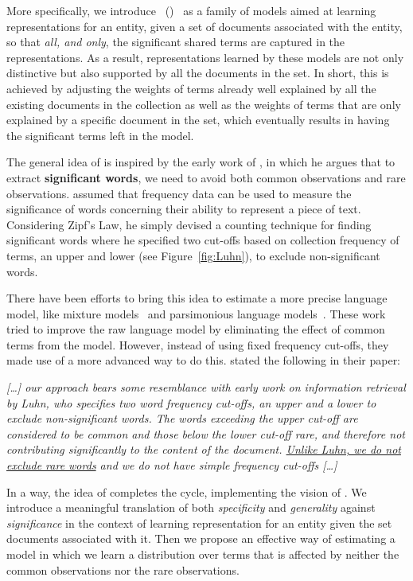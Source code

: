 More specifically, we introduce \emph{\swlms}\ (\acswlm)~\cite{Dehghani:CIKM2016:long, Dehghani:2016:CHIIR, Dehghani2016:trec} as a family of models aimed at learning representations for an entity, given a set of documents associated with the entity, so that \emph{all, and only}, the significant shared terms are captured in the representations. As a result, representations learned by these models are not only distinctive but also supported by all the documents in the set. In short, this is achieved by adjusting the weights of terms already well explained by all the existing documents in the collection as well as the weights of terms that are only explained by a specific document in the set, which eventually results in having the significant terms left in the model. 


The general idea of \acswlm is inspired by the early work of \citet{Luhn:1958}, in which he argues that to extract \textbf{significant words}, we need to avoid both common observations and rare observations. \citeauthor{Luhn:1958} assumed that frequency data can be used to measure the significance of words concerning their ability to represent a piece of text.  Considering Zipf's Law, he simply devised a counting technique for finding significant words where he specified two cut-offs based on collection frequency of terms, an upper and lower (see Figure~\ref{fig:Luhn}), to exclude non-significant words.

There have been efforts to bring this idea to estimate a more precise language model, like mixture models~\citep{Zhai:SMM:2001} and parsimonious language models~\citep{Hiemstra:2004}. These work tried to improve the raw language model by eliminating the effect of common terms from the model. However, instead of using fixed frequency cut-offs, they made use of a more advanced way to do this. \citeauthor{Hiemstra:2004} stated the following in their paper:
\begin{displayquote}

\textsl{
[\ldots] our approach bears some resemblance with early work on information retrieval by Luhn, who specifies
two word frequency cut-offs, an upper and a lower to exclude non-significant words. 
The words exceeding the upper cut-off are considered to be common and those below the lower cut-off rare, and therefore not contributing significantly to the content of the document. \ul{Unlike Luhn, we do not exclude rare words} and we do not have simple frequency cut-offs [\ldots]}

\end{displayquote} 
In a way, the idea of \acswlm completes the cycle, implementing the vision of \citeauthor{Luhn:1958}.  We introduce a meaningful translation of both \textit{specificity} and \textit{generality} against \textit{significance} in the context of learning representation for an entity given the set documents associated with it. Then we propose an effective way of estimating a model in which we learn a distribution over terms that is affected by neither the common observations nor the rare observations. 
%

